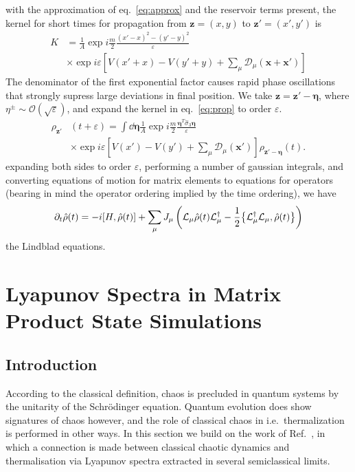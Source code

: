 \documentclass{article}
\let\vec\bm
\begin{document}
with the approximation of eq.~\ref{eq:approx} and the reservoir terms present, the kernel for short times for propagation from $\vec{z} = (x, y)$ to $\vec{z}' = (x', y')$ is
\begin{align}
    K &= \frac{1}{A} \exp{i\frac{m}{2}\frac{\left({x}'-{x}\right)^2-\left({y}'-{y}\right)^2}{\varepsilon}}\\
    &\times \exp{i\varepsilon \left[V\left({x}'+{x}\right)-V\left({y}'+{y}\right) + \sum_\mu \mathcal{D}_\mu(\vec{x}+\vec{x}')\right]}\nonumber
\end{align}
The denominator of the first exponential factor causes rapid phase oscillations that strongly supress large deviations in final position.
We take $\vec{z} = \vec{z}' - \vec{\eta}$, where $\eta^\pm  \sim \mathcal{O}(\sqrt{\varepsilon})$, and expand the kernel in eq.~\ref{eq:prop} to order $\varepsilon$. 
\begin{align}
    \rho_{\vec{z}'}&(t+\varepsilon) = \int \dd{\vec{\eta}}\frac{1}{A} \exp{i\frac{m}{2}\frac{\vec{\eta}^T\hat{\sigma}_3\vec{\eta}}{\varepsilon}}\\
    &\times \exp{i\varepsilon \left[V\left({x'}\right)-V\left({y'}\right) + \sum_\mu \mathcal{D}_\mu(\vec{x'})\right]}\rho_{\vec{z}'-\vec{\eta}}(t).\nonumber
\end{align}
expanding both sides to order $\varepsilon$, performing a number of gaussian integrals, and converting equations of motion for matrix elements to equations for operators (bearing in mind the operator ordering implied by the time ordering), we have
\begin{equation}
    \partial_t \hat{\rho}(t) = -i \comm{H}{\hat{\rho}(t)} + \sum_\mu J_\mu\left( \mathcal{L}_\mu\hat{\rho}(t)\mathcal{L}_\mu^\dagger - \frac{1}{2} \acomm{\mathcal{L}_\mu^\dagger\mathcal{L}_\mu}{\hat{\rho}(t)}\right)\nonumber
\end{equation}
the Lindblad equations.
\section{Lyapunov Spectra in Matrix Product State Simulations}\label{sec:chaos}
%
\subsection{Introduction}
%
According to the classical definition, chaos is precluded in quantum systems by the unitarity of the Schr\"odinger equation.
Quantum evolution does show signatures of chaos however, and the role of classical chaos in i.e.\ thermalization is performed in other ways.
In this section we build on the work of Ref.~\cite{Andrew}, in which a connection is made between classical chaotic dynamics and thermalisation via Lyapunov spectra extracted in several semiclassical limits.
%
\end{document}
